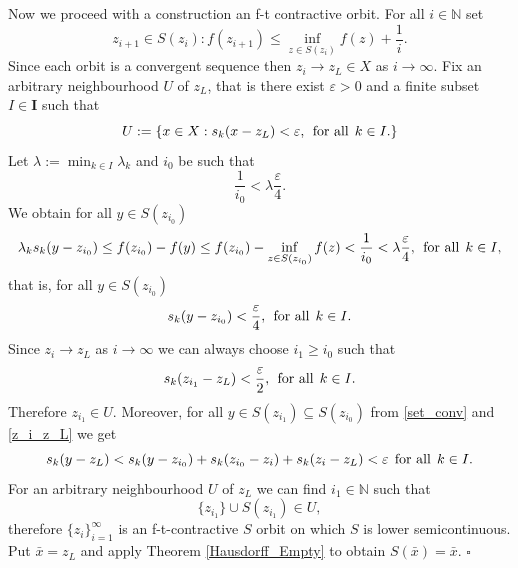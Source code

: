 \documentclass{article}
\def\text#1{\,\;\hbox{#1}\;\,}
\newcommand{\N}{\mathbb{N}}
\renewenvironment{proof}
         {\begin{trivlist}\item[
         {\bf Proof.}]}{{\hfill $\square$} \end{trivlist}}
\begin{document}
\begin{proof}
Now we proceed with a construction an f-t contractive orbit. For all $i \in \N$ set
\[z_{i+1} \in S(z_i): f(z_{i+1}) \leq \inf_{z \in S(z_i)} f(z)+\frac{1}{i}.\]
Since each orbit is a convergent sequence then $z_i \rightarrow z_L \in X$ as $i \rightarrow \infty$. Fix an arbitrary neighbourhood $U$ of $z_L$, that is there exist $\varepsilon>0$ and a finite subset $I \in \mathbf{I}$ such that
\[U:=\{x \in X: s_k(x-z_L)<\varepsilon, \text{for all} k \in I.\}\]  
Let $\displaystyle \lambda:=\min_{k \in I}\lambda_k$ and $i_0$ be such that 
\[
\frac{1}{i_0}<\lambda\frac{\varepsilon}{4}.
\]
We obtain for all $y \in S(z_{i_0})$
\[ \lambda_k s_k(y-z_{i_0}) \leq f(z_{i_0})-f(y) \leq f(z_{i_0})-\inf_{z \in S(z_{i_0})}f(z)<\frac{1}{i_0}<\lambda \frac{\varepsilon}{4}, \text{for all} k \in I,
\]
that is, for all $y \in S(z_{i_0})$
\begin{equation}
\label{set_conv}
s_k(y-z_{i_0})< \frac{\varepsilon}{4}, \text{for all} k  \in I.
\end{equation}
Since $z_i \rightarrow z_L$ as $i \rightarrow \infty$ we can always choose $i_1 \geq i_0$ such that 
\begin{equation}
\label{z_i_z_L}
s_k(z_{i_1}-z_L)< \frac{\varepsilon}{2}, \text{for all} k \in I.
\end{equation}
Therefore $z_{i_1} \in U$. Moreover, for all $y \in S(z_{i_1}) \subseteq S(z_{i_0})$ from \ref{set_conv} and \ref{z_i_z_L} we get
\[s_k(y-z_L)<s_k(y-z_{i_0})+s_k(z_{i_0}-z_i)+s_k(z_i-z_L)<\varepsilon \text{for all} k \in I.\]
For an arbitrary neighbourhood $U$ of $z_L$ we can find $i_1 \in \N$ such that
\[\{z_{i_1}\} \cup S(z_{i_1}) \in U,\]
therefore $\{z_i\}_{i=1}^{\infty}$ is an f-t-contractive $S$ orbit on which $S$ is lower semicontinuous. Put $\bar{x}=z_L$ and apply Theorem \ref{Hausdorff_Empty} to obtain $S(\bar{x})=\bar{x}$. 
\end{proof}
\end{document}
